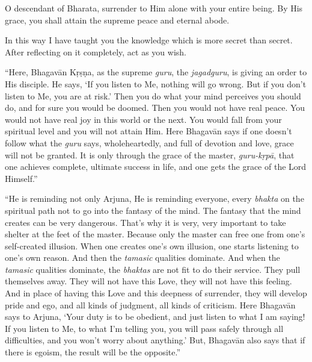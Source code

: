 {O descendant of Bharata, surrender to Him alone with your entire being. By His grace, you shall attain the supreme peace and eternal abode.}

{In this way I have taught you the knowledge which is more secret than secret. After reflecting on it completely, act as you wish.}

\enquote{Here, Bhagavān Kṛṣṇa, as the supreme \textit{guru}, the \textit{jagadguru}, is giving an order to His disciple. He says, \enquote{If you listen to Me, nothing will go wrong. But if you don’t listen to Me, you are at risk.} Then you do what your mind perceives you should do, and for sure you would be doomed. Then you would not have real peace. You would not have real joy in this world or the next. You would fall from your spiritual level and you will not attain Him. Here Bhagavān says if one doesn’t follow what the \textit{guru} says, wholeheartedly, and full of devotion and love, grace will not be granted. It is only through the grace of the master, \textit{guru-kṛpā}, that one achieves complete, ultimate success in life, and one gets the grace of the Lord Himself.}

\enquote{He is reminding not only Arjuna, He is reminding everyone, every \textit{bhakta} on the spiritual path not to go into the fantasy of the mind. The fantasy that the mind creates can be very dangerous. That’s why it is very, very important to take shelter at the feet of the master. Because only the master can free one from one’s self-created illusion. When one creates one’s own illusion, one starts listening to one’s own reason. And then the \textit{tamasic} qualities dominate. And when the \textit{tamasic} qualities dominate, the \textit{bhaktas} are not fit to do their service. They pull themselves away. They will not have this Love, they will not have this feeling. And in place of having this Love and this deepness of surrender, they will develop pride and ego, and all kinds of judgment, all kinds of criticism. Here Bhagavān says to Arjuna, \enquote{Your duty is to be obedient, and just listen to what I am saying! If you listen to Me, to what I’m telling you, you will pass safely through all difficulties, and you won’t worry about anything.} But, Bhagavān also says that if there is egoism, the result will be the opposite.}

